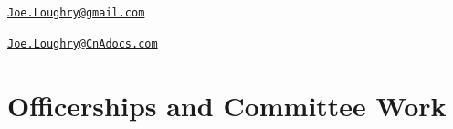 \documentclass[12pt,twoside,letterpaper]{article}
\begin{document}


\vspace{-10mm}


\vspace{-8mm}


\vspace{-7mm}


\vspace{-7mm}


\newpage


\vspace*{-26mm}\hfill\href{mailto:Joe.Loughry@gmail.com}%
{\nolinkurl{Joe.Loughry@gmail.com}}

\vspace*{-11mm}


\vspace{-7mm}


\vspace{-7mm}


\vspace{-7mm}


\vspace{-7mm}


\vspace{-7mm}


\vspace{3mm}

\noindent


\newpage


\vspace*{-23mm}\hfill\href{mailto:Joe.Loughry@CnAdocs.com}%
{\nolinkurl{Joe.Loughry@CnAdocs.com}}

\vspace*{-7mm}
\section*{Officerships and Committee Work}
\vspace{-2mm}
\end{document}
